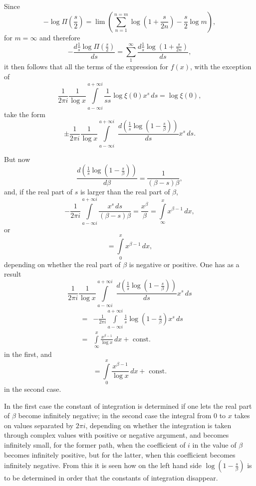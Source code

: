 \documentclass[a4paper,12pt]{article}
\begin{document}
Since
\[ - \log \Pi \left( \frac{s}{2} \right)
   = \lim \left( \sum_{n=1}^{n = m}
         \log \left( 1 + \frac{s}{2n} \right)
         - \frac{s}{2} \log m \right),\]
for $m = \infty$ and therefore
\[ - \frac{\displaystyle d \frac{1}{s}
            \log \Pi \left( \frac{s}{2} \right)}{ds}
   = \sum_1^\infty \frac{\displaystyle d \frac{1}{s}
            \log \left( 1 + \frac{s}{2n} \right)}{ds},\]
it then follows that all the terms of the expression for $f(x)$, with
the exception of
\[ \frac{1}{2\pi i} \frac{1}{\log x}
         \int\limits_{a - \infty i}^{a + \infty i}
         \frac{1}{ss} \log \xi(0) x^s \,ds
   = \log \xi(0), \]
take the form
\[ \pm \frac{1}{2\pi i} \frac{1}{\log x}
         \int\limits_{a - \infty i}^{a + \infty i} \, \,
         \frac{\displaystyle d \left( \frac{1}{s} \log \left(
               1 - \frac{s}{\beta} \right) \right)}{ds}
         x^s \,ds.\]

But now
\[ \frac{\displaystyle d \left( \frac{1}{s} \log \left(
               1 - \frac{s}{\beta} \right) \right)}{d\beta}
   = \frac{1}{(\beta - s)\beta},\]
and, if the real part of $s$ is larger than the real part of
$\beta$,
\[ - \frac{1}{2\pi i} \int\limits_{a - \infty i}^{a + \infty i}
         \frac{x^s \,ds}{(\beta - s)\beta}
   = \frac{x^\beta}{\beta} = \int\limits_\infty^x x^{\beta - 1} \,dx,\]
or
\[ = \int\limits_0^x x^{\beta - 1} \,dx,\]
depending on whether the real part of $\beta$ is negative or
positive.  One has as a result
\[ \frac{1}{2\pi i} \frac{1}{\log x}
         \int\limits_{a - \infty i}^{a + \infty i} \, \,
         \frac{\displaystyle d \left( \frac{1}{s} \log \left(
               1 - \frac{s}{\beta} \right) \right)}{ds}
         x^s \,ds \]
\begin{eqnarray*}
   &=& - \frac{1}{2\pi i} \int\limits_{a - \infty i}^{a + \infty i}
         \frac{1}{s} \log \left( 1 - \frac{s}{\beta} \right)
         x^s \,ds \\
   &=& \int\limits_\infty^x \frac{x^{\beta - 1}}{\log x} \,dx
     + \mbox{ const.}
\end{eqnarray*}
in the first, and
\[
   =   \int\limits_0^x \frac{x^{\beta - 1}}{\log x} \,dx
     + \mbox{ const.} \]
in the second case.

In the first case the constant of integration is determined if one
lets the real part of $\beta$ become infinitely negative; in the
second case the integral from $0$ to $x$ takes on values separated
by $2\pi i$, depending on whether the integration is taken through
complex values with positive or negative argument, and becomes
infinitely small, for the former path, when the coefficient of $i$
in the value of $\beta$ becomes infinitely positive, but for the
latter, when this coefficient becomes infinitely negative.
From this it is seen how on the left hand side
$\displaystyle \log \left( 1 - \frac{s}{\beta} \right)$
is to be determined in order that the constants of integration
disappear.
\end{document}
